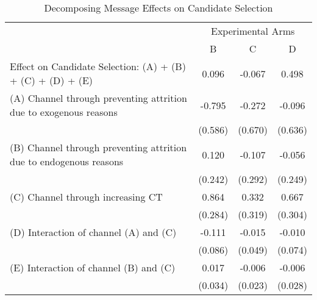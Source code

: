 \documentclass[12pt, a4paper]{article}
\begin{document}
\begin{table}[H]

\caption{\label{tab:decompose-candidate}Decomposing Message Effects on Candidate Selection}
\centering
\fontsize{8}{10}\selectfont
\begin{threeparttable}
\begin{tabular}[t]{lccc}
\toprule
\multicolumn{1}{c}{ } & \multicolumn{3}{c}{Experimental Arms} \\
\cmidrule(l{3pt}r{3pt}){2-4}
 & B & C & D\\
\midrule
Effect on Candidate Selection: (A) + (B) + (C) + (D) + (E) & 0.096 & -0.067 & 0.498\\
(A) Channel through preventing attrition due to exogenous reasons & -0.795 & -0.272 & -0.096\\
 & (0.586) & (0.670) & (0.636)\\
(B) Channel through preventing attrition due to endogenous reasons & 0.120 & -0.107 & -0.056\\
 & (0.242) & (0.292) & (0.249)\\
(C) Channel through increasing CT & 0.864 & 0.332 & 0.667\\
 & (0.284) & (0.319) & (0.304)\\
(D) Interaction of channel (A) and (C) & -0.111 & -0.015 & -0.010\\
 & (0.086) & (0.049) & (0.074)\\
(E) Interaction of channel (B) and (C) & 0.017 & -0.006 & -0.006\\
 & (0.034) & (0.023) & (0.028)\\
\bottomrule
\end{tabular}
\begin{tablenotes}
\item 
\end{tablenotes}
\end{threeparttable}
\end{table}

\clearpage


\end{document}
